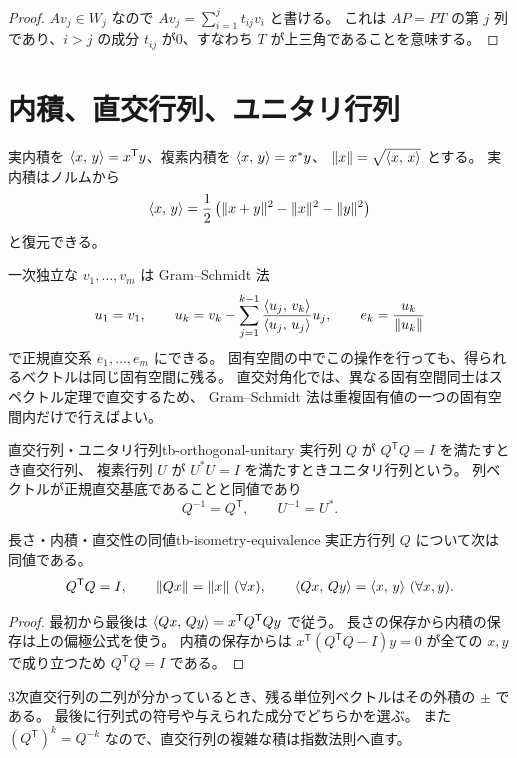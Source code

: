 \begin{proof}
$Av_j\in W_j$ なので
$Av_j=\sum_{i=1}^j t_{ij}v_i$ と書ける。
これは $AP=PT$ の第 $j$ 列であり、$i>j$ の成分 $t_{ij}$ が0、すなわち $T$ が上三角であることを意味する。
\end{proof}

\section{内積、直交行列、ユニタリ行列}

実内積を $\langle x,\, y \rangle=x^{\mathsf T}y$、複素内積を $\langle x,\, y \rangle=x^*y$、
$\lVert x \rVert=\sqrt{\langle x,\, x \rangle}$ とする。
実内積はノルムから
\[
\langle x,\, y \rangle=\frac12\left(\lVert x+y \rVert^2-\lVert x \rVert^2-\lVert y \rVert^2\right)
\]
と復元できる。

一次独立な $v_1,\ldots,v_m$ は Gram--Schmidt 法
\[
u_1=v_1,\qquad
u_k=v_k-\sum_{j=1}^{k-1}
\frac{\langle u_j,\, v_k \rangle}{\langle u_j,\, u_j \rangle}u_j,\qquad
e_k=\frac{u_k}{\lVert u_k \rVert}
\]
で正規直交系 $e_1,\ldots,e_m$ にできる。
固有空間の中でこの操作を行っても、得られるベクトルは同じ固有空間に残る。
直交対角化では、異なる固有空間同士はスペクトル定理で直交するため、
Gram--Schmidt 法は重複固有値の一つの固有空間内だけで行えばよい。

\begin{definition}{直交行列・ユニタリ行列}{tb-orthogonal-unitary}
実行列 $Q$ が $Q^{\mathsf T}Q=I$ を満たすとき直交行列、
複素行列 $U$ が $U^*U=I$ を満たすときユニタリ行列という。
列ベクトルが正規直交基底であることと同値であり
\[
Q^{-1}=Q^{\mathsf T},\qquad U^{-1}=U^*.
\]
\end{definition}

\begin{proposition}{長さ・内積・直交性の同値}{tb-isometry-equivalence}
実正方行列 $Q$ について次は同値である。
\[
Q^{\mathsf T}Q=I,\qquad
\lVert Qx \rVert=\lVert x \rVert\ (\forall x),\qquad
\langle Qx,\, Qy \rangle=\langle x,\, y \rangle\ (\forall x,y).
\]
\end{proposition}

\begin{proof}
最初から最後は $\langle Qx,\, Qy \rangle=x^{\mathsf T}Q^{\mathsf T}Qy$ で従う。
長さの保存から内積の保存は上の偏極公式を使う。
内積の保存からは
$x^{\mathsf T}(Q^{\mathsf T}Q-I)y=0$ が全ての $x,y$ で成り立つため $Q^{\mathsf T}Q=I$ である。
\end{proof}

3次直交行列の二列が分かっているとき、残る単位列ベクトルはその外積の $\pm$ である。
最後に行列式の符号や与えられた成分でどちらかを選ぶ。
また $(Q^{\mathsf T})^k=Q^{-k}$ なので、直交行列の複雑な積は指数法則へ直す。


